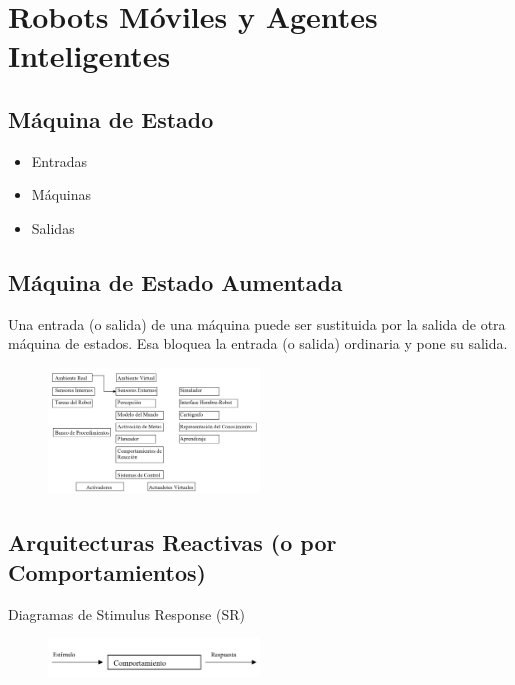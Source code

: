\chapter{Robots Móviles y Agentes Inteligentes}


\section{Máquina de Estado}

\begin{itemize}
	\item[\textbullet] Entradas
	\item[\textbullet] Máquinas
	\item[\textbullet] Salidas
\end{itemize}

\section{Máquina de Estado Aumentada}

Una entrada (o salida) de una máquina puede ser sustituida por la salida de otra máquina de estados. Esa bloquea la entrada (o salida) ordinaria y pone su salida.

\begin{figure}[h!]
	\centering
	\includegraphics[width=0.5\textwidth]{images/img49.png}
	\label{figura49}
\end{figure}

\section{Arquitecturas Reactivas (o por Comportamientos)}

Diagramas de Stimulus Response (SR)

\begin{figure}[h!]
	\centering
	\includegraphics[width=0.5\textwidth]{images/img50.png}
	\label{figura50}
\end{figure}

